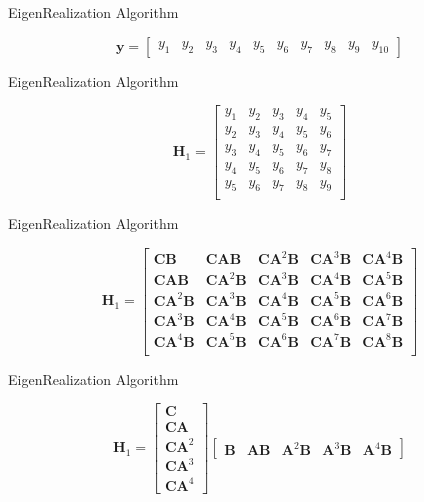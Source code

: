 \documentclass[aspectratio=169, usenames, dvipsnames]{beamer}
\begin{document}
\begin{frame}{EigenRealization Algorithm}
  \vfill

  \Large
  \[
  \bm{y}
  =
  \begin{bmatrix}
    y_1 & y_2 & y_3 & y_4 & y_5 & y_6 & y_7 & y_8 & y_9 & y_{10}
  \end{bmatrix}
  \]

  \vfill
\end{frame}


\begin{frame}{EigenRealization Algorithm}
  \vfill

  \Large
  \[
  \bm{H}_1
  =
  \begin{bmatrix}
    y_1 & y_2 & y_3 & y_4 & y_5 \\
    y_2 & y_3 & y_4 & y_5 & y_6 \\
    y_3 & y_4 & y_5 & y_6 & y_7 \\
    y_4 & y_5 & y_6 & y_7 & y_8 \\
    y_5 & y_6 & y_7 & y_8 & y_9 \\
  \end{bmatrix}
  \]

  \vfill
\end{frame}

\begin{frame}{EigenRealization Algorithm}
  \vfill

  \Large
  \[
  \bm{H}_1
  =
  \begin{bmatrix}
    \bm{CB} & \bm{CAB} & \bm{CA}^2 \bm{B} & \bm{CA}^3 \bm{B} & \bm{CA}^4 \bm{B} \\
    \bm{CAB} & \bm{CA}^2 \bm{B} & \bm{CA}^3 \bm{B} & \bm{CA}^4 \bm{B} & \bm{CA}^5 \bm{B} \\
    \bm{CA}^2 \bm{B} & \bm{CA}^3 \bm{B} & \bm{CA}^4 \bm{B} & \bm{CA}^5 \bm{B} & \bm{CA}^6 \bm{B} \\
    \bm{CA}^3 \bm{B} & \bm{CA}^4 \bm{B} & \bm{CA}^5 \bm{B} & \bm{CA}^6 \bm{B} & \bm{CA}^7 \bm{B} \\
    \bm{CA}^4 \bm{B} & \bm{CA}^5 \bm{B} & \bm{CA}^6 \bm{B} & \bm{CA}^7 \bm{B} & \bm{CA}^8 \bm{B} \\
  \end{bmatrix}
  \]

  \vfill
\end{frame}


\begin{frame}{EigenRealization Algorithm}
  \vfill

  \Large
  \[
  \bm{H}_1
  =
  \begin{bmatrix}
    \bm{C} \\ \bm{CA} \\ \bm{CA}^2 \\ \bm{CA}^3 \\ \bm{CA}^4
  \end{bmatrix}
  \begin{bmatrix}
    \bm{B} & \bm{AB} & \bm{A}^2 \bm{B} & \bm{A}^3 \bm{B} & \bm{A}^4 \bm{B}
  \end{bmatrix}
  \]

  \vfill
\end{frame}
\end{document}
